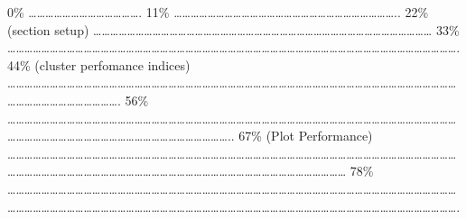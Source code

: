 \documentclass[
]{article}
\begin{document}
\textbar{} \textbar{} \textbar{} 0\% \textbar{}
\textbar\ldots\ldots\ldots\ldots\ldots\ldots\ldots\ldots\ldots\ldots\ldots\ldots\ldots.
\textbar{} 11\% \textbar{}
\textbar\ldots\ldots\ldots\ldots\ldots\ldots\ldots\ldots\ldots\ldots\ldots\ldots\ldots\ldots\ldots\ldots\ldots\ldots\ldots\ldots\ldots\ldots\ldots\ldots\ldots\ldots..
\textbar{} 22\% (section setup) \textbar{}
\textbar\ldots\ldots\ldots\ldots\ldots\ldots\ldots\ldots\ldots\ldots\ldots\ldots\ldots\ldots\ldots\ldots\ldots\ldots\ldots\ldots\ldots\ldots\ldots\ldots\ldots\ldots\ldots\ldots\ldots\ldots\ldots\ldots\ldots\ldots\ldots\ldots\ldots\ldots\ldots\ldots{}
\textbar{} 33\% \textbar{}
\textbar\ldots\ldots\ldots\ldots\ldots\ldots\ldots\ldots\ldots\ldots\ldots\ldots\ldots\ldots\ldots\ldots\ldots\ldots\ldots\ldots\ldots\ldots\ldots\ldots\ldots\ldots\ldots\ldots\ldots\ldots\ldots\ldots\ldots\ldots\ldots\ldots\ldots\ldots\ldots\ldots\ldots\ldots\ldots\ldots\ldots\ldots\ldots\ldots\ldots\ldots\ldots\ldots\ldots.
\textbar{} 44\% (cluster perfomance indices) \textbar{}
\textbar\ldots\ldots\ldots\ldots\ldots\ldots\ldots\ldots\ldots\ldots\ldots\ldots\ldots\ldots\ldots\ldots\ldots\ldots\ldots\ldots\ldots\ldots\ldots\ldots\ldots\ldots\ldots\ldots\ldots\ldots\ldots\ldots\ldots\ldots\ldots\ldots\ldots\ldots\ldots\ldots\ldots\ldots\ldots\ldots\ldots\ldots\ldots\ldots\ldots\ldots\ldots\ldots\ldots\ldots\ldots\ldots\ldots\ldots\ldots\ldots\ldots\ldots\ldots\ldots\ldots\ldots.
\textbar{} 56\% \textbar{}
\textbar\ldots\ldots\ldots\ldots\ldots\ldots\ldots\ldots\ldots\ldots\ldots\ldots\ldots\ldots\ldots\ldots\ldots\ldots\ldots\ldots\ldots\ldots\ldots\ldots\ldots\ldots\ldots\ldots\ldots\ldots\ldots\ldots\ldots\ldots\ldots\ldots\ldots\ldots\ldots\ldots\ldots\ldots\ldots\ldots\ldots\ldots\ldots\ldots\ldots\ldots\ldots\ldots\ldots\ldots\ldots\ldots\ldots\ldots\ldots\ldots\ldots\ldots\ldots\ldots\ldots\ldots\ldots\ldots\ldots\ldots\ldots\ldots\ldots\ldots\ldots\ldots\ldots\ldots\ldots..
\textbar{} 67\% (Plot Performance) \textbar{}
\textbar\ldots\ldots\ldots\ldots\ldots\ldots\ldots\ldots\ldots\ldots\ldots\ldots\ldots\ldots\ldots\ldots\ldots\ldots\ldots\ldots\ldots\ldots\ldots\ldots\ldots\ldots\ldots\ldots\ldots\ldots\ldots\ldots\ldots\ldots\ldots\ldots\ldots\ldots\ldots\ldots\ldots\ldots\ldots\ldots\ldots\ldots\ldots\ldots\ldots\ldots\ldots\ldots\ldots\ldots\ldots\ldots\ldots\ldots\ldots\ldots\ldots\ldots\ldots\ldots\ldots\ldots\ldots\ldots\ldots\ldots\ldots\ldots\ldots\ldots\ldots\ldots\ldots\ldots\ldots\ldots\ldots\ldots\ldots\ldots\ldots\ldots\ldots\ldots\ldots\ldots\ldots\ldots\ldots{}
\textbar{} 78\% \textbar{}
\textbar\ldots\ldots\ldots\ldots\ldots\ldots\ldots\ldots\ldots\ldots\ldots\ldots\ldots\ldots\ldots\ldots\ldots\ldots\ldots\ldots\ldots\ldots\ldots\ldots\ldots\ldots\ldots\ldots\ldots\ldots\ldots\ldots\ldots\ldots\ldots\ldots\ldots\ldots\ldots\ldots\ldots\ldots\ldots\ldots\ldots\ldots\ldots\ldots\ldots\ldots\ldots\ldots\ldots\ldots\ldots\ldots\ldots\ldots\ldots\ldots\ldots\ldots\ldots\ldots\ldots\ldots\ldots\ldots\ldots\ldots\ldots\ldots\ldots\ldots\ldots\ldots\ldots\ldots\ldots\ldots\ldots\ldots\ldots\ldots\ldots\ldots\ldots\ldots\ldots\ldots\ldots\ldots\ldots\ldots\ldots\ldots\ldots\ldots\ldots\ldots\ldots\ldots\ldots\ldots\ldots\ldots.
\end{document}
